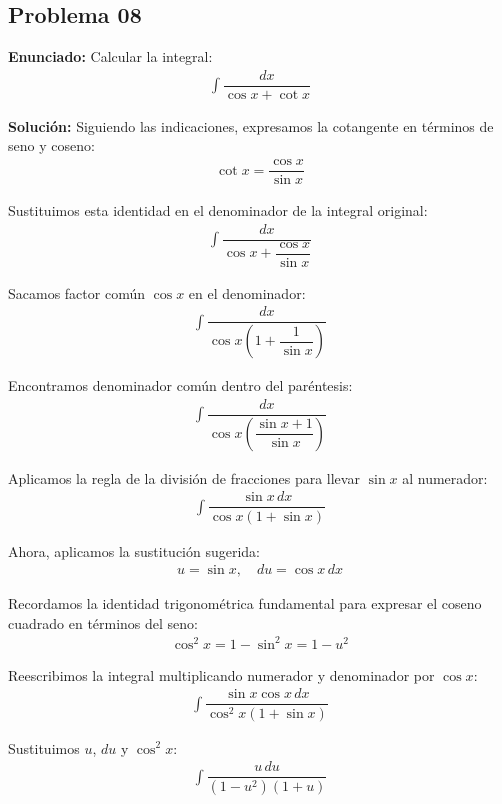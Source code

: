 \subsection*{Problema 08}
\textbf{Enunciado:} Calcular la integral:
\begin{align*}
\int \dfrac{dx}{\cos x + \cot x}
\end{align*}

\textbf{Solución:} 
Siguiendo las indicaciones, expresamos la cotangente en términos de seno y coseno:
\begin{align*}
\cot x = \dfrac{\cos x}{\sin x}
\end{align*}

Sustituimos esta identidad en el denominador de la integral original:
\begin{align*}
\int \dfrac{dx}{\cos x + \dfrac{\cos x}{\sin x}}
\end{align*}

Sacamos factor común $\cos x$ en el denominador:
\begin{align*}
\int \dfrac{dx}{\cos x \left(1 + \dfrac{1}{\sin x}\right)}
\end{align*}

Encontramos denominador común dentro del paréntesis:
\begin{align*}
\int \dfrac{dx}{\cos x \left(\dfrac{\sin x + 1}{\sin x}\right)}
\end{align*}

Aplicamos la regla de la división de fracciones para llevar $\sin x$ al numerador:
\begin{align*}
\int \dfrac{\sin x \, dx}{\cos x (1 + \sin x)}
\end{align*}

Ahora, aplicamos la sustitución sugerida:
\begin{align*}
u = \sin x, \quad du = \cos x \, dx
\end{align*}

Recordamos la identidad trigonométrica fundamental para expresar el coseno cuadrado en términos del seno:
\begin{align*}
\cos^2 x = 1 - \sin^2 x = 1 - u^2
\end{align*}

Reescribimos la integral multiplicando numerador y denominador por $\cos x$:
\begin{align*}
\int \dfrac{\sin x \cos x \, dx}{\cos^2 x (1 + \sin x)}
\end{align*}

Sustituimos $u$, $du$ y $\cos^2 x$:
\begin{align*}
\int \dfrac{u \, du}{(1 - u^2)(1 + u)}
\end{align*}

